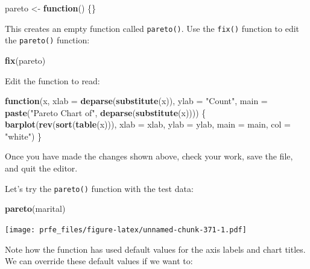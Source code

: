 \documentclass[12pt,a4paper]{book}
\newenvironment{Shaded}{\begin{snugshade}}{\end{snugshade}}
\newcommand{\KeywordTok}[1]{\textcolor[rgb]{0.13,0.29,0.53}{\textbf{#1}}}
\newcommand{\DataTypeTok}[1]{\textcolor[rgb]{0.13,0.29,0.53}{#1}}
\newcommand{\StringTok}[1]{\textcolor[rgb]{0.31,0.60,0.02}{#1}}
\newcommand{\ControlFlowTok}[1]{\textcolor[rgb]{0.13,0.29,0.53}{\textbf{#1}}}
\newcommand{\NormalTok}[1]{#1}
\theoremstyle{definition}
\theoremstyle{definition}
\theoremstyle{definition}
\theoremstyle{remark}
\begin{document}
\begin{Shaded}
\begin{Highlighting}[]
\NormalTok{pareto <-}\StringTok{ }\ControlFlowTok{function}\NormalTok{() \{\}}
\end{Highlighting}
\end{Shaded}

This creates an empty function called \texttt{pareto()}. Use the
\texttt{fix()} function to edit the \texttt{pareto()} function:

\begin{Shaded}
\begin{Highlighting}[]
\KeywordTok{fix}\NormalTok{(pareto)}
\end{Highlighting}
\end{Shaded}

Edit the function to read:

\begin{Shaded}
\begin{Highlighting}[]
\ControlFlowTok{function}\NormalTok{(x,}
         \DataTypeTok{xlab =} \KeywordTok{deparse}\NormalTok{(}\KeywordTok{substitute}\NormalTok{(x)),}
         \DataTypeTok{ylab =} \StringTok{"Count"}\NormalTok{,}
         \DataTypeTok{main =} \KeywordTok{paste}\NormalTok{(}\StringTok{"Pareto Chart of"}\NormalTok{, }\KeywordTok{deparse}\NormalTok{(}\KeywordTok{substitute}\NormalTok{(x)))) \{}
  \KeywordTok{barplot}\NormalTok{(}\KeywordTok{rev}\NormalTok{(}\KeywordTok{sort}\NormalTok{(}\KeywordTok{table}\NormalTok{(x))),}
          \DataTypeTok{xlab =}\NormalTok{ xlab,}
          \DataTypeTok{ylab =}\NormalTok{ ylab,}
          \DataTypeTok{main =}\NormalTok{ main,}
          \DataTypeTok{col =} \StringTok{"white"}\NormalTok{)}
\NormalTok{\}}
\end{Highlighting}
\end{Shaded}

Once you have made the changes shown above, check your work, save the
file, and quit the editor.

Let's try the \texttt{pareto()} function with the test data:

\begin{Shaded}
\begin{Highlighting}[]
\KeywordTok{pareto}\NormalTok{(marital)}
\end{Highlighting}
\end{Shaded}

\texttt{[image: prfe\_files/figure-latex/unnamed-chunk-371-1.pdf]}

Note how the function has used default values for the axis labels and
chart titles. We can override these default values if we want to:
\end{document}
